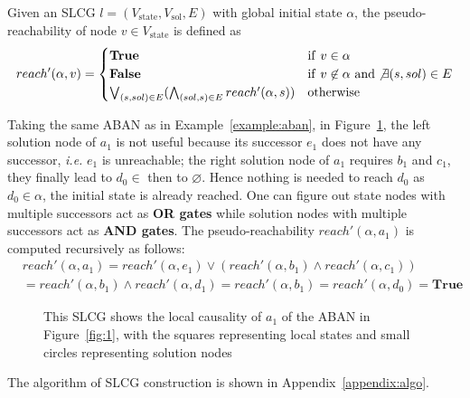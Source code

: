 \documentclass[runningheads]{llncs}
\newcommand{\st}{{\mathrm{state}}}
\newcommand{\sol}{{\mathrm{sol}}}
\begin{document}
\begin{definition}\label{defPseudoReach}
Given an SLCG $l=(V_\st,V_\sol,E)$ with global initial state $\alpha$, the pseudo-reachability of node $v\in V_\st$ is defined as
\begin{equation}
\nonumber
    reach'(\alpha,v)=
    \begin{cases}
    \mathrm{\bf True} & {\rm if\ } v\in \alpha\\
    \mathrm{\bf False} & {\rm if\ } v\not\in \alpha\ {\rm and} \not\exists(s,sol) \in E\\
    \bigvee_{(s,sol) \in E} (\bigwedge_{(sol,s)\in E} reach'(\alpha,s)) & {\rm otherwise}
\end{cases}
\end{equation}

\end{definition}
\begin{example}\label{example:SLCG}
Taking the same ABAN as in Example~\ref{example:aban}, in Figure~\ref{fig:2}, the left solution node of $a_1$ is not useful because its successor $e_1$ does not have any successor, \textit{i.e.} $e_1$ is unreachable;
the right solution node of $a_1$ requires $b_1$ and $c_1$, they finally lead to $d_0\in$ then to $\varnothing$.
Hence nothing is needed to reach $d_0$ as $d_0\in \alpha$, the initial state is already reached.
One can figure out state nodes with multiple successors act as \textbf{OR gates} while solution nodes with multiple successors act as \textbf{AND gates}. The pseudo-reachability $reach'(\alpha,a_1)$ is computed recursively as follows:
\begin{align*}
&reach'(\alpha,a_1)=reach'(\alpha,e_1)\lor(reach'(\alpha,b_1)\land reach'(\alpha,c_1))\\
&=reach'(\alpha,b_1)\land reach'(\alpha,d_1)=reach'(\alpha,b_1)=reach'(\alpha,d_0)=\mathbf{True}
\end{align*}
\end{example}

\begin{figure}[ht]
\centering

\caption{This SLCG shows the local causality of $a_1$ of the ABAN in Figure~\ref{fig:1}, with the squares representing local states and small circles representing solution nodes}
\label{fig:2}
\end{figure}

The algorithm of SLCG construction is shown in Appendix~\ref{appendix:algo}.
\end{document}
